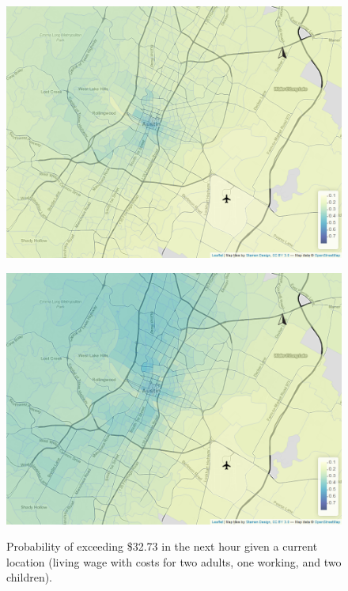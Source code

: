 \begin{figure}[htb]
\begin{minipage}[t]{.48\linewidth}
        \centering
        \includegraphics[width=\linewidth]{img/tailprob_32_73__142.png}
        \label{fig:wages:appendix2:c}
    \end{minipage}
    \begin{minipage}[t]{0.48\linewidth}
        \centering
        \includegraphics[width=\linewidth]{img/tailprob_32_73__168.png}
        \label{fig:wages:appendix2:d}
    \end{minipage}
    \caption{Probability of exceeding \$32.73 in the next hour given a current location (living wage with costs for two adults, one working, and two children).}
    \label{fig:wages:appendix2}
\end{figure}



